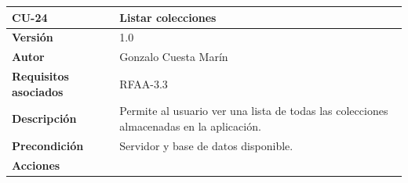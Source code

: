 \documentclass[
]{article}
\begin{document}
\begin{longtable}[]{@{}ll@{}}
\toprule
\begin{minipage}[b]{0.16\columnwidth}\raggedright
\textbf{CU-24}\strut
\end{minipage} & \begin{minipage}[b]{0.78\columnwidth}\raggedright
\textbf{Listar colecciones}\strut
\end{minipage}\tabularnewline
\midrule
\endhead
\begin{minipage}[t]{0.16\columnwidth}\raggedright
\textbf{Versión}\strut
\end{minipage} & \begin{minipage}[t]{0.78\columnwidth}\raggedright
1.0\strut
\end{minipage}\tabularnewline
\begin{minipage}[t]{0.16\columnwidth}\raggedright
\textbf{Autor}\strut
\end{minipage} & \begin{minipage}[t]{0.78\columnwidth}\raggedright
Gonzalo Cuesta Marín\strut
\end{minipage}\tabularnewline
\begin{minipage}[t]{0.16\columnwidth}\raggedright
\textbf{Requisitos asociados}\strut
\end{minipage} & \begin{minipage}[t]{0.78\columnwidth}\raggedright
RFAA-3.3\strut
\end{minipage}\tabularnewline
\begin{minipage}[t]{0.16\columnwidth}\raggedright
\textbf{Descripción}\strut
\end{minipage} & \begin{minipage}[t]{0.78\columnwidth}\raggedright
Permite al usuario ver una lista de todas las colecciones almacenadas en
la aplicación.\strut
\end{minipage}\tabularnewline
\begin{minipage}[t]{0.16\columnwidth}\raggedright
\textbf{Precondición}\strut
\end{minipage} & \begin{minipage}[t]{0.78\columnwidth}\raggedright
Servidor y base de datos disponible.\strut
\end{minipage}\tabularnewline
\begin{minipage}[t]{0.16\columnwidth}\raggedright
\textbf{Acciones}\strut
\end{minipage} & \begin{minipage}[t]{0.78\columnwidth}\raggedright
\begin{enumerate}

\end{enumerate}
\end{minipage}
\end{longtable}
\end{document}
